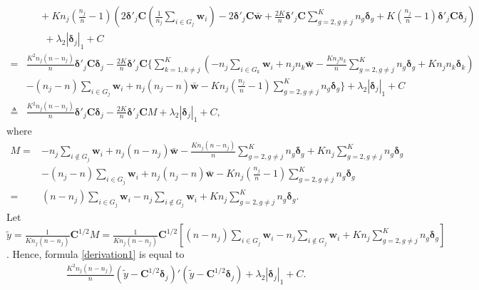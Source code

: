 \documentclass[12pt]{article}
\begin{document}
\begin{align}
&~~~~~~ + K n_j (\frac{n_j}{n}-1) \left( 2 \bm \delta'_j \bm C (\frac{1}{n_j} \sum_{i \in G_j} \bm w_i) - 2 \bm \delta'_j \bm C \bar{\bm w} + \frac{2K}{n} \bm \delta'_j \bm C \sum_{g=2, g \neq j}^{K} n_g \bm \delta_g + K (\frac{n_j}{n}-1) \bm \delta'_j \bm C \bm \delta_j \right)  \nonumber  \\
&~~~~~~~~ + \lambda_2 | \bm \delta_j |_1 + C \nonumber \\
=& \frac{K^2 n_j (n - n_j)}{n} \bm \delta'_j \bm C \bm \delta_j - \frac{2 K}{n} \bm \delta'_j \bm C \{ \sum_{k=1, k \neq j}^{K} (-n_j \sum_{i \in G_k} \bm w_i + n_j n_k \bar{\bm w} - \frac{K n_j n_k }{n} \sum_{g=2, g \neq j}^{K} n_g \bm \delta_g + K n_j n_k \bm \delta_k) \nonumber \\
&- (n_j - n) \sum_{i \in G_j} \bm w_i + n_j (n_j - n) \bar{\bm w} - K n_j (\frac{n_j}{n}-1) \sum_{g=2, g \neq j}^{K} n_g \bm \delta_g \} + \lambda_2 | \bm \delta_j |_1 + C \nonumber \\
\triangleq & \frac{K^2 n_j (n - n_j)}{n} \bm \delta'_j \bm C \bm \delta_j - \frac{2 K}{n} \bm \delta'_j \bm C M + \lambda_2 | \bm \delta_j |_1 + C,
\end{align}
where
\begin{align*}
M =& -n_j \sum_{i \notin G_j} \bm w_i + n_j (n - n_j) \bar{\bm w} - \frac{K n_j (n - n_j)}{n} \sum_{g=2, g \neq j}^{K} n_g \bm \delta_g + K n_j \sum_{g=2, g \neq j}^{K} n_g \bm \delta_g     \\
& - (n_j - n) \sum_{i \in G_j} \bm w_i + n_j (n_j - n) \bar{\bm w} - K n_j (\frac{n_j}{n}-1) \sum_{g=2, g \neq j}^{K} n_g \bm \delta_g       \\
=& (n - n_j) \sum\limits_{i \in G_j} \bm w_i - n_j \sum\limits_{i \notin G_j} \bm w_i + K n_j \sum\limits_{g=2, g \neq j}^{K} n_g \bm \delta_g.
\end{align*}
Let $\tilde{y} = \frac{1}{K n_j (n - n_j)} \bm C^{1/2} M = \frac{1}{K n_j (n - n_j)} \bm C^{1/2} \left[ (n - n_j) \sum\limits_{i \in G_j} \bm w_i - n_j \sum\limits_{i \notin G_j} \bm w_i + K n_j \sum\limits_{g=2, g \neq j}^{K} n_g \bm \delta_g \right]$.
Hence, formula \eqref{derivation1} is equal to
\begin{align*}
\frac{K^2 n_j (n - n_j)}{n} (\tilde{y} - \bm C^{1/2} \bm \delta_j)'(\tilde{y} - \bm C^{1/2} \bm \delta_j) + \lambda_2 | \bm \delta_j |_1 + C.
\end{align*}
\end{document}
